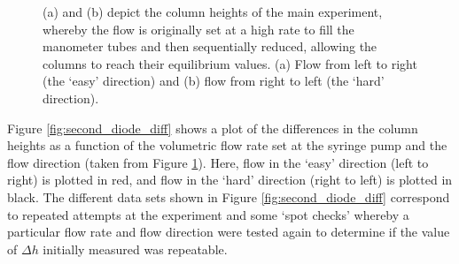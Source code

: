 \begin{figure}
\begin{center}
\end{center}
\caption[Column heights as a function of time and flow rate (second diode)]{\label{fig:second_diode_right_to_left} (a) and (b) depict the column heights of the main experiment, whereby the flow is originally set at a high rate to fill the manometer tubes and then sequentially reduced, allowing the columns to reach their equilibrium values. (a) Flow from left to right (the `easy' direction) and (b)  flow from right to left (the `hard' direction).}
\end{figure}

Figure \ref{fig:second_diode_diff} shows a plot of the differences in the column heights as a function of the volumetric flow rate set at the syringe pump and the flow direction (taken from Figure \ref{fig:second_diode_right_to_left}). Here, flow in the `easy' direction (left to right) is plotted in red, and flow in the `hard' direction (right to left) is plotted in black. The different data sets shown in Figure \ref{fig:second_diode_diff} correspond to repeated attempts at the experiment and some `spot checks' whereby a particular flow rate and flow direction were tested again to determine if the value of $\Delta h$ initially measured was repeatable.

